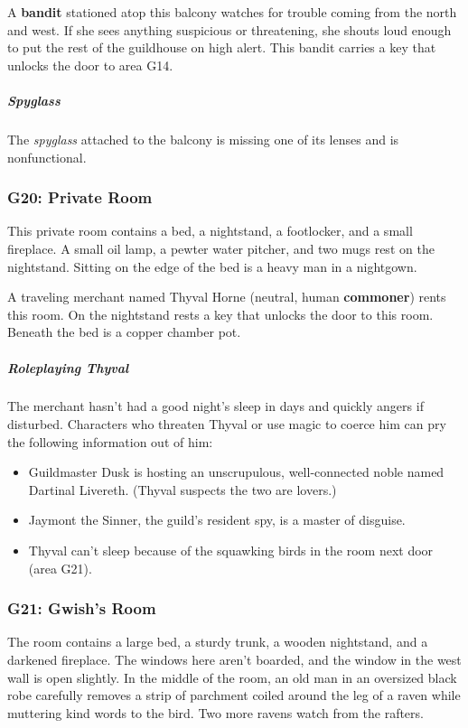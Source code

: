 \documentclass[10pt,a4paper,twoside,bg=print,twocolumn,openany,nodeprecatedcode]{dndbook}
\begin{document}
A \textbf{bandit} stationed atop this balcony watches for trouble coming from the north and west. If she sees anything suspicious or threatening, she shouts loud enough to put the rest of the guildhouse on high alert. This bandit carries a key that unlocks the door to area G14.

\subparagraph{Spyglass}
The \textit{spyglass} attached to the balcony is missing one of its lenses and is nonfunctional.

\subsubsection{G20: Private Room}
\begin{DndReadAloud}{}
This private room contains a bed, a nightstand, a footlocker, and a small fireplace. A small oil lamp, a pewter water pitcher, and two mugs rest on the nightstand. Sitting on the edge of the bed is a heavy man in a nightgown.

\end{DndReadAloud}

A traveling merchant named Thyval Horne (neutral, human \textbf{commoner}) rents this room. On the nightstand rests a key that unlocks the door to this room. Beneath the bed is a copper chamber pot.

\subparagraph{Roleplaying Thyval}
The merchant hasn't had a good night's sleep in days and quickly angers if disturbed. Characters who threaten Thyval or use magic to coerce him can pry the following information out of him:


\begin{itemize}
\item Guildmaster Dusk is hosting an unscrupulous, well-connected noble named Dartinal Livereth. (Thyval suspects the two are lovers.)
\item Jaymont the Sinner, the guild's resident spy, is a master of disguise.
\item Thyval can't sleep because of the squawking birds in the room next door (area G21).
\end{itemize}

\subsubsection{G21: Gwish's Room}
\begin{DndReadAloud}{}
The room contains a large bed, a sturdy trunk, a wooden nightstand, and a darkened fireplace. The windows here aren't boarded, and the window in the west wall is open slightly. In the middle of the room, an old man in an oversized black robe carefully removes a strip of parchment coiled around the leg of a raven while muttering kind words to the bird. Two more ravens watch from the rafters.

\end{DndReadAloud}
\end{document}
